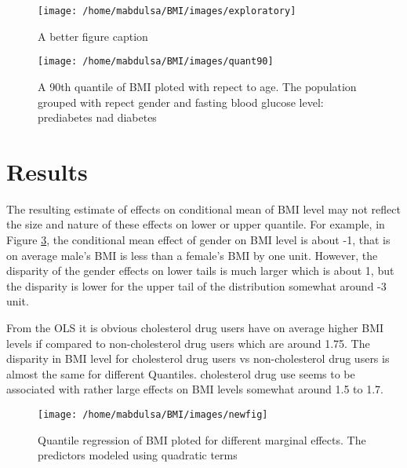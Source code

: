 \documentclass[
  12pt,
]{article}
\begin{document}
\begin{figure}

{\centering \texttt{[image: /home/mabdulsa/BMI/images/exploratory]} 

}

\caption{A better figure caption}\label{fig:data}
\end{figure}

\begin{figure}

{\centering \texttt{[image: /home/mabdulsa/BMI/images/quant90]} 

}

\caption{A 90th quantile of BMI ploted with repect to age. The population grouped with repect gender and fasting blood glucose level: prediabetes nad diabetes}\label{fig:unnamed-chunk-1}
\end{figure}

\section{Results}

The resulting estimate of effects on conditional mean of BMI level may not reflect the size and nature of these effects on lower or upper quantile. For example, in Figure \ref{fig:resu1}, the conditional mean effect of gender on BMI level is about -1, that is on average male's BMI is less than a female's BMI by one unit. However, the disparity of the gender effects on lower tails is much larger which is about 1, but the disparity is lower for the upper tail of the distribution somewhat around -3 unit.

From the OLS it is obvious cholesterol drug users have on average higher BMI levels if compared to non-cholesterol drug users which are around 1.75. The disparity in BMI level for cholesterol drug users vs non-cholesterol drug users is almost the same for different Quantiles. cholesterol drug use seems to be associated with rather large effects on BMI levels somewhat around 1.5 to 1.7.

\begin{figure}

{\centering \texttt{[image: /home/mabdulsa/BMI/images/newfig]} 

}

\caption{Quantile regression of BMI ploted  for different marginal effects. The predictors modeled using quadratic terms }\label{fig:resu1}
\end{figure}
\end{document}
